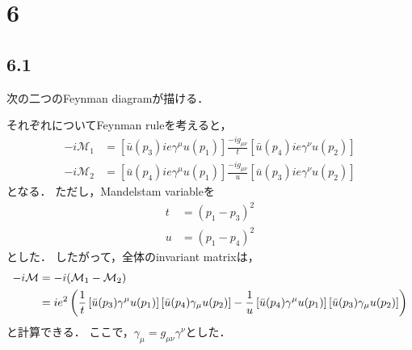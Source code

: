 \section*{6}
\subsection*{6.1}
次の二つのFeynman diagramが描ける．

それぞれについてFeynman ruleを考えると，
\begin{align}
  -i\mathcal{M}_1 &= \left[\bar{u}(p_3)ie\gamma^{\mu} u(p_1)\right] \frac{-ig_{\mu \nu}}{t} \left[\bar{u}(p_4)ie\gamma^{\nu} u(p_2)\right] \\
  -i\mathcal{M}_2 &= \left[\bar{u}(p_4)ie\gamma^{\mu} u(p_1)\right] \frac{-ig_{\mu \nu}}{u} \left[\bar{u}(p_3)ie\gamma^{\nu} u(p_2)\right]
\end{align}
となる．
ただし，Mandelstam variableを
\begin{align}
  t &= (p_1 - p_3)^2 \\
  u &= (p_1 - p_4)^2
\end{align}
とした．
したがって，全体のinvariant matrixは，
\begin{align}
  -i\mathcal{M} &= -i (\mathcal{M}_1 - \mathcal{M}_2) \notag\\
  &= ie^2 \left(\frac{1}{t}\left[\bar{u}(p_3)\gamma^{\mu} u(p_1)\right]  \left[\bar{u}(p_4)\gamma_{\mu} u(p_2)\right] 
  - \frac{1}{u}\left[\bar{u}(p_4)\gamma^{\mu} u(p_1)\right]  \left[\bar{u}(p_3)\gamma_{\mu} u(p_2)\right]\right)
\end{align}
と計算できる．
ここで，$\gamma_{\mu} = g_{\mu\nu}\gamma^{\nu}$とした．

